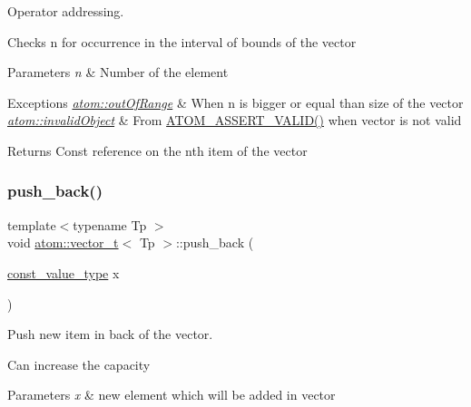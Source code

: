 Operator addressing. 

Checks n for occurrence in the interval of bounds of the vector 
\begin{DoxyParams}{Parameters}
{\em n} & Number of the element \\
\hline
\end{DoxyParams}

\begin{DoxyExceptions}{Exceptions}
{\em \hyperlink{classatom_1_1out_of_range}{atom\+::out\+Of\+Range}} & When n is bigger or equal than size of the vector \\
\hline
{\em \hyperlink{classatom_1_1invalid_object}{atom\+::invalid\+Object}} & From \hyperlink{debug__tools_8h_a273b49426c51bc6a7eb989ee0acbdc6b}{A\+T\+O\+M\+\_\+\+A\+S\+S\+E\+R\+T\+\_\+\+V\+A\+L\+I\+D()} when vector is not valid \\
\hline
\end{DoxyExceptions}
\begin{DoxyReturn}{Returns}
Const reference on the nth item of the vector 
\end{DoxyReturn}
\mbox{\label{classatom_1_1vector__t_a92c657f98ab473119a6b04dad7cd2091}} 
\subsubsection{\texorpdfstring{push\+\_\+back()}{push\_back()}}
{\footnotesize\ttfamily template$<$typename Tp $>$ \\
void \hyperlink{classatom_1_1vector__t}{atom\+::vector\+\_\+t}$<$ Tp $>$\+::push\+\_\+back (\begin{DoxyParamCaption}\item[{\hyperlink{classatom_1_1vector__t_a14fe7ee127e522f41f345462311c924e}{const\+\_\+value\+\_\+type}}]{x }\end{DoxyParamCaption})\hspace{0.3cm}{\ttfamily [inline]}}



Push new item in back of the vector. 

Can increase the capacity 
\begin{DoxyParams}{Parameters}
{\em x} & new element which will be added in vector \\
\hline
\end{DoxyParams}

